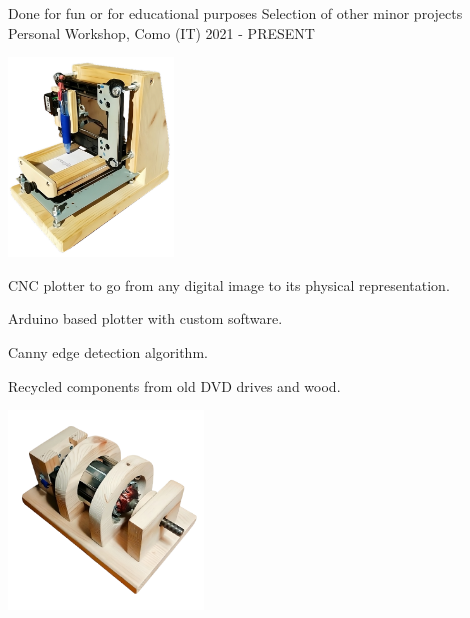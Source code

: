 \begin{cventries}
    \cventry
    {Done for fun or for educational purposes}
    {Selection of other minor projects}
    {Personal Workshop, Como (IT)}
    {2021 - PRESENT}
    {
        \begin{minipage}{0.45\textwidth}
            \vspace{5pt}
            \begin{center}
                \includegraphics[height=150pt]{common/img/Minors/Gorlu.png}
                \hspace{4cm}
            \end{center}
            \vspace{5pt}
            CNC plotter to go from any digital image to its physical representation.\\
            \begin{cvitems}
                \item {Arduino based plotter with custom software.}
                \item {Canny edge detection algorithm.}
                \item {Recycled components from old DVD drives and wood.}
            \end{cvitems}
            \vspace{4mm}
            \vspace{5pt}
        \end{minipage}
        \hfill
        \begin{minipage}{0.45\textwidth}
            \vspace{5pt}
            \begin{center}
                \includegraphics[height=150pt]{common/img/Minors/Joppo.png}

\end{center}
\end{minipage}}
\end{cventries}
